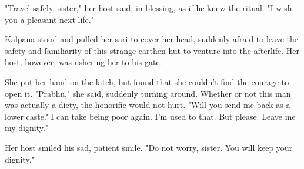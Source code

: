 \documentclass{amsart}
\begin{document}
	"Travel safely, sister," her host said, in blessing, as if he knew the ritual. "I wish you a pleasant
	next life."
	
	Kalpana stood and pulled her sari to cover her head, suddenly afraid to leave the safety and familiarity of this strange earthen hut to venture into the afterlife. Her host, however, was ushering her to his gate. 
	
	She put her hand on the latch, but found that she couldn't find the courage to open it. "Prabhu," she said, suddenly turning around. Whether or not this man was
	actually a diety, the honorific would not hurt. "Will you send me back as a
	lower caste? I can take being poor again. I'm used to that. But please. Leave me my dignity."
	
	Her host smiled his sad, patient smile. "Do not worry, sister. You will keep your dignity."
	
\end{document}
